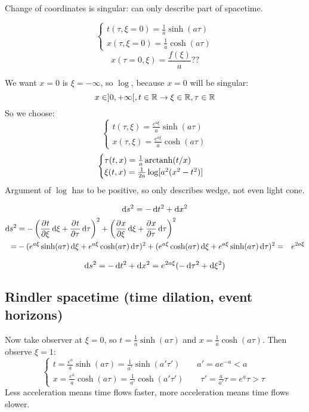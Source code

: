 Change of coordinates is singular: can only describe part of spacetime.

\[ \begin{cases}
t (\tau, \xi = 0) = \frac{1}{a} \sinh(a\tau) \\
x(\tau, \xi = 0) = \frac{1}{a} \cosh(a\tau)
\end{cases}\]
\[ x(\tau = 0, \xi) = \frac{f(\xi)}{a} ?? \]

We want $x = 0$ is $\xi = -\infty$, so $\log$, because $x=0$ will be singular:
\[ x \in ]0,+\infty[, t \in \mathbb{R} \to \xi \in \mathbb{R}, \tau \in \mathbb{R} \]
So we choose:
\[ \begin{cases}
t (\tau, \xi) = \frac{e^{a\xi}}{a} \sinh(a\tau) \\
x(\tau, \xi) = \frac{ e^{a\xi} }{a} \cosh(a\tau)
\end{cases}\]
\[ \begin{cases}
\tau(t,x) = \frac{1}{a} \operatorname{arctanh}(t/x) \\
\xi(t,x) = \frac{1}{2a} \log[a^2(x^2 - t^2)]
\end{cases} \]
Argument of $\log$ has to be positive, so only describes wedge, not even light cone.

\[ \operatorname{d \!}{s}^2 = - \operatorname{d \!}{t}^2 + \operatorname{d \!}{x}^2 \]
\begin{align*} \diff{s}^2 &= -\left(\pd{t}{\xi} \diff{\xi} + \pd{t}{\tau} \diff{\tau}\right)^2+\left( \pd{x}{\xi} \diff{\xi} + \pd{x}{\tau} \diff{\tau} \right)^2 \\
=& -(e^{a\xi}\sinh(a\tau)\diff{\xi} + e^{a\xi}\cosh(a\tau)\diff{\tau})^2
+(e^{a\xi}\cosh(a\tau)\diff{\xi} + e^{a\xi}\sinh(a\tau)\diff{\tau})^2
=& e^{2a\xi}
\end{align*}

\[ \operatorname{d \!}{s}^2 = - \operatorname{d \!}{t}^2 + \operatorname{d \!}{x}^2 = e^{2a\xi}(- \operatorname{d \!}{\tau}^2 + \operatorname{d \!}{\xi}^2)\]

\subsection{Rindler spacetime (time dilation, event horizons)}

Now take observer at $\xi = 0$, so $t = \frac{1}{a}\sinh(a\tau)$ and $x = \frac{1}{a} \cosh(a\tau)$. Then observe $\xi = 1$:
\[ \begin{cases}
t = \frac{e^{a}}{a} \sinh(a\tau) = \frac{1}{a'} \sinh(a'\tau') \qquad a'=ae^{-a} < a\\
x = \frac{e^{a}}{a} \cosh(a\tau) = \frac{1}{a'} \cosh(a'\tau') \qquad \tau' = \frac{a}{a'} \tau = e^{a}\tau > \tau
\end{cases} \]
Less acceleration means time flows faster, more acceleration means time flows slower.

